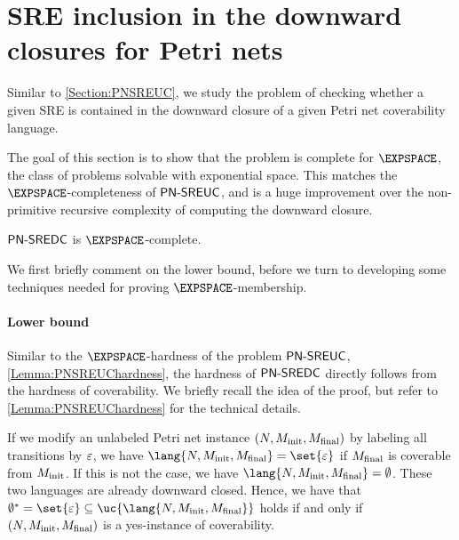 \documentclass[../../diss.tex]{subfiles}
\begin{document}
\section{SRE inclusion in the downward closures for Petri nets}%
\label{Section:PNSREDC}%

Similar to \cref{Section:PNSREUC}, we study the problem of checking whether a given SRE is contained in the downward closure of a given Petri net coverability language.

\begin{problem}
    \problemshort{($\SREDC$)}
\end{problem}

The goal of this section is to show that the problem is complete for $\EXPSPACE$, the class of problems solvable with exponential space.
This matches the $\EXPSPACE$-completeness of $\mathsf{PN\text{-}SREUC}$, and is a huge improvement over the non-primitive recursive complexity of computing the downward closure.

\begin{theorem}%
\label{Theorem:PNSREDC}%
    $\SREDC$ is $\EXPSPACE$-complete.
\end{theorem}

We first briefly comment on the lower bound, before we turn to developing some techniques needed for proving $\EXPSPACE$-membership.

\paragraph{Lower bound}

Similar to the $\EXPSPACE$-hardness of the problem $\mathsf{PN\text{-}SREUC}$, \cref{Lemma:PNSREUChardness}, the hardness of $\SREDC$ directly follows from the hardness of coverability.
We briefly recall the idea of the proof, but refer to \cref{Lemma:PNSREUChardness} for the technical details.

If we modify an unlabeled Petri net instance $(N,M_{\text{init}},M_{\text{final}})$ by labeling all transitions by $\varepsilon$, we have $\lang{N,\Minit,\Mfinal} = \set{\eps}$ if $M_{\text{final}}$ is coverable from $M_{\text{init}}$.
If this is not the case, we have $\lang{N,\Minit,\Mfinal} = \emptyset$.
These two languages are already downward closed.
Hence, we have that $\emptyset^* = \set{\eps} \subseteq \uc{\lang{N,\Minit,\Mfinal}}$ holds if and only if $(N,M_{\text{init}},M_{\text{final}})$ is a yes-instance of coverability.
\end{document}
